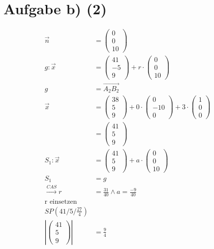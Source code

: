 \documentclass[12pt,a4paper]{report}
\begin{document}
\section{Aufgabe b) (2)}
\begin{align*}
	\overrightarrow{n} &= \begin{pmatrix}
		0\\0\\10
	\end{pmatrix} \\
	g : \overrightarrow{x} &= \begin{pmatrix}
		41\\-5\\9
	\end{pmatrix} + r \cdot \begin{pmatrix}
		0\\0\\10
	\end{pmatrix} \\
	g &= \overrightarrow{A_2B_2} \\
	\overrightarrow{x} &= \begin{pmatrix}
		38 \\ 5 \\ 9
	\end{pmatrix} + 0 \cdot \begin{pmatrix}
		0 \\ -10 \\ 0
	\end{pmatrix} + 3 \cdot \begin{pmatrix}
		1 \\ 0 \\0
	\end{pmatrix} \\
	&= \begin{pmatrix}
		41 \\ 5 \\ 9
	\end{pmatrix} \\
	S_1: \overrightarrow x &= \begin{pmatrix}
		41\\5 \\9
	\end{pmatrix} + a  \cdot \begin{pmatrix}
		0\\0\\10
	\end{pmatrix} \\
	S_1 &= g \\
	\xrightarrow{CAS} r &= \frac{31}{40} \land a = \frac{-9}{40} \\
	\text{r einsetzen} \\
	SP(41/5/\frac{27}{4}) \\
	|\begin{pmatrix}41\\5\\9\end{pmatrix}| &= \frac{9}{4}
\end{align*}
\end{document}
